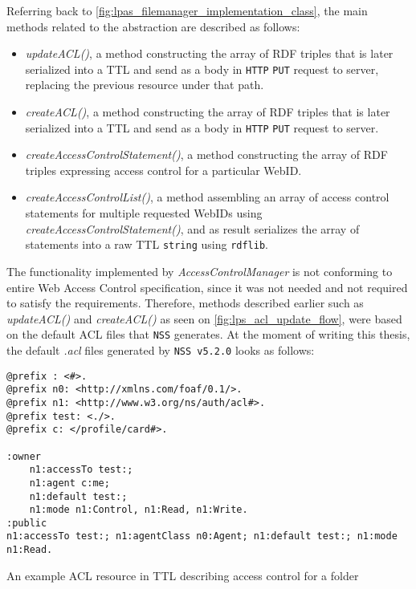 Referring back to \autoref{fig:lpas_filemanager_implementation_class}, the main methods related to the abstraction are described as follows:
\begin{itemize}
    \item \textit{updateACL()}, a method constructing the array of RDF triples that is later serialized into a TTL and send as a body in \texttt{HTTP} \texttt{PUT} request to \solid{} server, replacing the previous resource under that path.
    \item \textit{createACL()}, a method constructing the array of RDF triples that is later serialized into a TTL and send as a body in \texttt{HTTP} \texttt{PUT} request to \solid{} server.
    \item \textit{createAccessControlStatement()}, a method constructing the array of RDF triples expressing access control for a particular WebID. 
    \item \textit{createAccessControlList()}, a method assembling an array of access control statements for multiple requested WebIDs using \textit{createAccessControlStatement()}, and as result serializes the array of statements into a raw TTL \texttt{string} using \texttt{rdflib}.
\end{itemize}

The functionality implemented by \textit{AccessControlManager} is not conforming to entire Web Access Control specification, since it was not needed and not required to satisfy the \lpa{} requirements. Therefore, methods described earlier such as \textit{updateACL()} and \textit{createACL()} as seen on \autoref{fig:lps_acl_update_flow}, were based on the default ACL files that \texttt{NSS} generates. At the moment of writing this thesis, the default \textit{.acl} files generated by \texttt{NSS v5.2.0} looks as follows:

\begin{listing}[H]    
\begin{verbatim}
@prefix : <#>.
@prefix n0: <http://xmlns.com/foaf/0.1/>.
@prefix n1: <http://www.w3.org/ns/auth/acl#>.
@prefix test: <./>.
@prefix c: </profile/card#>.
 
:owner
    n1:accessTo test:;
    n1:agent c:me;
    n1:default test:;
    n1:mode n1:Control, n1:Read, n1:Write.
:public
n1:accessTo test:; n1:agentClass n0:Agent; n1:default test:; n1:mode n1:Read.
\end{verbatim}
\caption{An example ACL resource in TTL describing access control for a folder} 
\label{lst:acl_file_example}
\end{listing}

